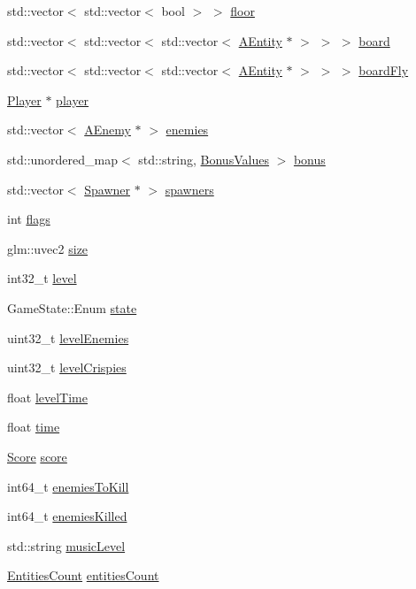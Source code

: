 \begin{DoxyCompactItemize}
\item 
std\+::vector$<$ std\+::vector$<$ bool $>$ $>$ \hyperlink{class_scene_game_a3f5c9fc6974a158f3e606bef4a33e881}{floor}
\item 
std\+::vector$<$ std\+::vector$<$ std\+::vector$<$ \hyperlink{class_a_entity}{A\+Entity} $\ast$ $>$ $>$ $>$ \hyperlink{class_scene_game_a2306af8a268c9d476d1060fa3daa1ac5}{board}
\item 
std\+::vector$<$ std\+::vector$<$ std\+::vector$<$ \hyperlink{class_a_entity}{A\+Entity} $\ast$ $>$ $>$ $>$ \hyperlink{class_scene_game_a8abb19247e59048f4f151f28934325ac}{board\+Fly}
\item 
\hyperlink{class_player}{Player} $\ast$ \hyperlink{class_scene_game_a7343447f840c96da20f2358c035b7ce4}{player}
\item 
std\+::vector$<$ \hyperlink{class_a_enemy}{A\+Enemy} $\ast$ $>$ \hyperlink{class_scene_game_a5fd5739b1dc811d2cc70cd73ea177d30}{enemies}
\item 
std\+::unordered\+\_\+map$<$ std\+::string, \hyperlink{struct_scene_game_1_1_bonus_values}{Bonus\+Values} $>$ \hyperlink{class_scene_game_a9d05f8167666796932daca9d06ed62d1}{bonus}
\item 
std\+::vector$<$ \hyperlink{class_spawner}{Spawner} $\ast$ $>$ \hyperlink{class_scene_game_a97955bb4971b1800da1e15bcb472150d}{spawners}
\item 
int \hyperlink{class_scene_game_a53d7732b5968cc22b938451d371592c9}{flags}
\item 
glm\+::uvec2 \hyperlink{class_scene_game_a3cf109ade202cfa93be0778d9218ef14}{size}
\item 
int32\+\_\+t \hyperlink{class_scene_game_ac35fc86484b9ce8a09efde387e049cb1}{level}
\item 
Game\+State\+::\+Enum \hyperlink{class_scene_game_a148576dff8050dfcf438ff29c0aaf400}{state}
\item 
uint32\+\_\+t \hyperlink{class_scene_game_aae46344cf5b218d3965836e3a6518296}{level\+Enemies}
\item 
uint32\+\_\+t \hyperlink{class_scene_game_a7d7cc035d462fa565775e0d2d19a64dc}{level\+Crispies}
\item 
float \hyperlink{class_scene_game_a0eb866e448133db3365b92c0c60740a7}{level\+Time}
\item 
float \hyperlink{class_scene_game_a7035bc7e8801e4d17cab3128d6d60be0}{time}
\item 
\hyperlink{class_score}{Score} \hyperlink{class_scene_game_ae548cebf05f9ca19eadf0e2c166c8ab4}{score}
\item 
int64\+\_\+t \hyperlink{class_scene_game_ac4533f3e18e31e85bd626764ee7f26f0}{enemies\+To\+Kill}
\item 
int64\+\_\+t \hyperlink{class_scene_game_a74a292034550a61d53fc19416acc2aaa}{enemies\+Killed}
\item 
std\+::string \hyperlink{class_scene_game_a725aea97a7eb7b1ee4ea7808fff9c948}{music\+Level}
\item 
\hyperlink{struct_scene_game_1_1_entities_count}{Entities\+Count} \hyperlink{class_scene_game_a8cc1f105984982e09ee8c3ef7d4bf20d}{entities\+Count}
\end{DoxyCompactItemize}

